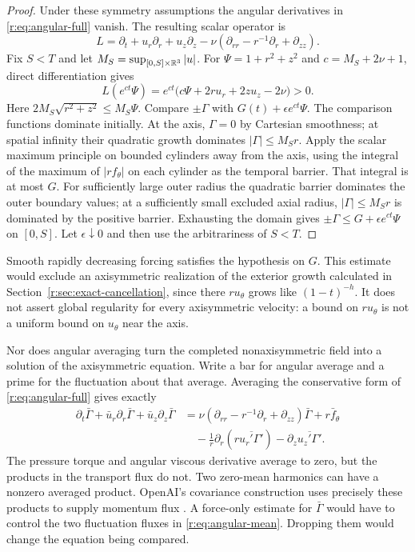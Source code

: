 \begin{proof}
Under these symmetry assumptions the angular derivatives in
\eqref{r:eq:angular-full} vanish. The resulting scalar operator is
\[
 L=\partial_t+u_r\partial_r+u_z\partial_z
       -\nu(\partial_{rr}-r^{-1}\partial_r+\partial_{zz}).
\]
Fix \(S<T\) and let \(M_S=\sup_{[0,S]\times\mathbb R^3}|u|\).
For \(\Psi=1+r^2+z^2\) and \(c=M_S+2\nu+1\), direct differentiation
gives
\[
 L(e^{ct}\Psi)
 =e^{ct}\bigl(c\Psi+2ru_r+2zu_z-2\nu\bigr)>0.
\]
Here \(2M_S\sqrt{r^2+z^2}\le M_S\Psi\).
Compare \(\pm\Gamma\) with \(G(t)+\epsilon e^{ct}\Psi\).
The comparison functions dominate initially. At the axis,
\(\Gamma=0\) by Cartesian smoothness; at spatial infinity their
quadratic growth dominates \(|\Gamma|\le M_Sr\).
Apply the scalar maximum principle on bounded cylinders away from the
axis, using the integral of the maximum of \(|rf_\theta|\) on each
cylinder as the temporal barrier. That integral is at most \(G\).
For sufficiently large outer radius the quadratic barrier dominates the
outer boundary values; at a sufficiently small excluded axial radius,
\(|\Gamma|\le M_Sr\) is dominated by the positive barrier.
Exhausting the domain gives
\(\pm\Gamma\le G+\epsilon e^{ct}\Psi\) on \([0,S]\).
Let \(\epsilon\downarrow0\) and then use the arbitrariness of \(S<T\).
\end{proof}

Smooth rapidly decreasing forcing satisfies the hypothesis on \(G\).
This estimate would exclude an axisymmetric realization of the exterior
growth calculated in Section~\ref{r:sec:exact-cancellation}, since there \(ru_\theta\) grows like
\((1-t)^{-h}\). It does not assert global regularity for every
axisymmetric velocity: a bound on \(ru_\theta\) is not a uniform bound
on \(u_\theta\) near the axis.

Nor does angular averaging turn the completed nonaxisymmetric field into
a solution of the axisymmetric equation. Write a bar for angular average
and a prime for the fluctuation about that average. Averaging the
conservative form of \eqref{r:eq:angular-full} gives exactly
\begin{equation}
 \begin{aligned}
 \partial_t\bar\Gamma+\bar u_r\partial_r\bar\Gamma
       +\bar u_z\partial_z\bar\Gamma
 &=\nu(\partial_{rr}-r^{-1}\partial_r+\partial_{zz})\bar\Gamma
       +r\bar f_\theta\\
 &\quad-\frac1r\partial_r
       \left(r\overline{u_r'\Gamma'}\right)
       -\partial_z\overline{u_z'\Gamma'}.
 \end{aligned}
 \label{r:eq:angular-mean}
\end{equation}
The pressure torque and angular viscous derivative average to zero, but
the products in the transport flux do not. Two zero-mean harmonics can
have a nonzero averaged product. OpenAI's covariance construction uses
precisely these products to supply momentum flux
\cite[(7.23), (9.11)]{openai-paper}. A force-only estimate for
\(\bar\Gamma\) would have to control the two fluctuation fluxes in
\eqref{r:eq:angular-mean}. Dropping them would change the equation being
compared.
